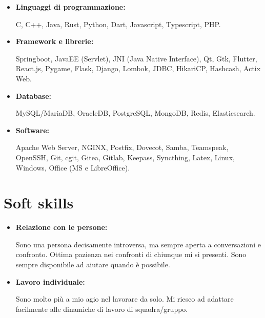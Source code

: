 \documentclass{paper}
\begin{document}
\begin{itemize}
    \item \textbf{Linguaggi di programmazione:}
    
    C, C++, Java, Rust, Python, Dart, Javascript, Typescript, PHP.

    \item \textbf{Framework e librerie:}
    
    Springboot, JavaEE (Servlet), JNI (Java Native Interface), Qt, Gtk, Flutter, React.js, Pygame, Flask, Django, Lombok, JDBC, HikariCP, Hashcash, Actix Web.

    \item \textbf{Database:}
    
    MySQL/MariaDB, OracleDB, PostgreSQL, MongoDB, Redis, Elasticsearch.

    \item \textbf{Software:}
    
    Apache Web Server, NGINX, Postfix, Dovecot, Samba, Teamspeak, OpenSSH, Git, cgit, Gitea, Gitlab, Keepass, Syncthing, Latex, Linux, Windows, Office (MS e LibreOffice).
\end{itemize}

\section{Soft skills}

\begin{itemize}
    \item \textbf{Relazione con le persone:}
    
    Sono una persona decisamente introversa, ma sempre aperta a conversazioni e confronto.
    Ottima pazienza nei confronti di chiunque mi si presenti.
    Sono sempre disponibile ad aiutare quando è possibile.

    \item \textbf{Lavoro individuale:}
    
    Sono molto più a mio agio nel lavorare da solo.
    Mi riesco ad adattare facilmente alle dinamiche di lavoro di squadra/gruppo.
\end{itemize}
\end{document}

